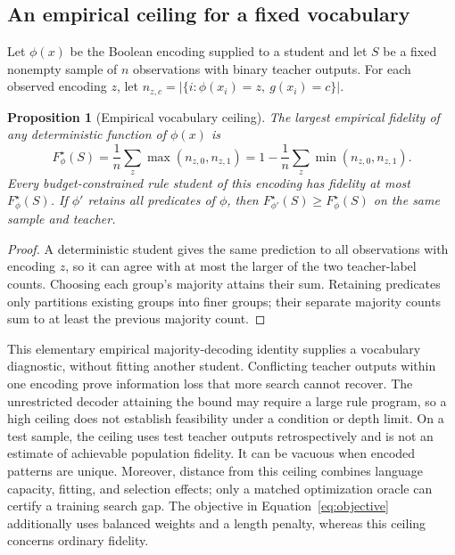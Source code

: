 \documentclass[a4paper,fleqn,review]{cas-sc}
\newtheorem{proposition}{Proposition}
\begin{document}
\subsection{An empirical ceiling for a fixed vocabulary}\label{sec:vocabulary-ceiling}
Let $\phi(x)$ be the Boolean encoding supplied to a student and let $S$ be a fixed nonempty sample of $n$ observations with binary teacher outputs. For each observed encoding $z$, let $n_{z,c}=|\{i:\phi(x_i)=z,\ g(x_i)=c\}|$.
\begin{proposition}[Empirical vocabulary ceiling]\label{prop:vocabulary}
The largest empirical fidelity of any deterministic function of $\phi(x)$ is
\begin{equation}\label{eq:vocabulary-ceiling}
 F^\star_\phi(S)=\frac{1}{n}\sum_z\max(n_{z,0},n_{z,1})
 =1-\frac{1}{n}\sum_z\min(n_{z,0},n_{z,1}).
\end{equation}
Every budget-constrained rule student of this encoding has fidelity at most $F^\star_\phi(S)$. If $\phi'$ retains all predicates of $\phi$, then $F^\star_{\phi'}(S)\geq F^\star_\phi(S)$ on the same sample and teacher.
\end{proposition}
\begin{proof}
A deterministic student gives the same prediction to all observations with encoding $z$, so it can agree with at most the larger of the two teacher-label counts. Choosing each group's majority attains their sum. Retaining predicates only partitions existing groups into finer groups; their separate majority counts sum to at least the previous majority count.
\end{proof}
This elementary empirical majority-decoding identity supplies a vocabulary diagnostic, without fitting another student. Conflicting teacher outputs within one encoding prove information loss that more search cannot recover. The unrestricted decoder attaining the bound may require a large rule program, so a high ceiling does not establish feasibility under a condition or depth limit. On a test sample, the ceiling uses test teacher outputs retrospectively and is not an estimate of achievable population fidelity. It can be vacuous when encoded patterns are unique. Moreover, distance from this ceiling combines language capacity, fitting, and selection effects; only a matched optimization oracle can certify a training search gap. The objective in Equation~\ref{eq:objective} additionally uses balanced weights and a length penalty, whereas this ceiling concerns ordinary fidelity.
\end{document}
